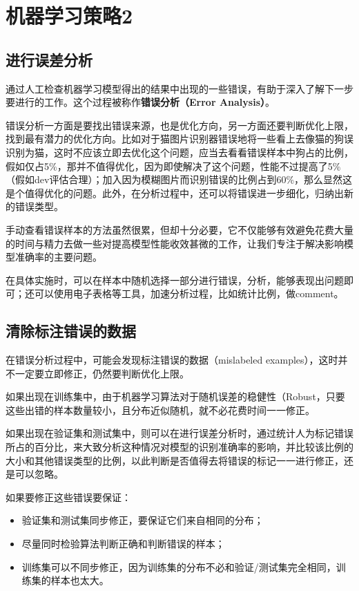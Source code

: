\documentclass[../../main.tex]{subfiles}
\begin{document}
\chapter{机器学习策略2}

\section{进行误差分析}
通过人工检查机器学习模型得出的结果中出现的一些错误，有助于深入了解下一步要进行的工作。这个过程被称作\textbf{错误分析（Error Analysis）}。

错误分析一方面是要找出错误来源，也是优化方向，另一方面还要判断优化上限，找到最有潜力的优化方向。比如对于猫图片识别器错误地将一些看上去像猫的狗误识别为猫，这时不应该立即去优化这个问题，应当去看看错误样本中狗占的比例，假如仅占5\%，那并不值得优化，因为即使解决了这个问题，性能不过提高了5\%（假如dev评估合理）；加入因为模糊图片而识别错误的比例占到60\%，那么显然这是个值得优化的问题。此外，在分析过程中，还可以将错误进一步细化，归纳出新的错误类型。

手动查看错误样本的方法虽然很累，但却十分必要，它不仅能够有效避免花费大量的时间与精力去做一些对提高模型性能收效甚微的工作，让我们专注于解决影响模型准确率的主要问题。

在具体实施时，可以在样本中随机选择一部分进行错误，分析，能够表现出问题即可；还可以使用电子表格等工具，加速分析过程，比如统计比例，做comment。

\section{清除标注错误的数据}
在错误分析过程中，可能会发现标注错误的数据（mislabeled examples），这时并不一定要立即修正，仍然要判断优化上限。

如果出现在训练集中，由于机器学习算法对于随机误差的稳健性（Robust，只要这些出错的样本数量较小，且分布近似随机，就不必花费时间一一修正。

如果出现在验证集和测试集中，则可以在进行误差分析时，通过统计人为标记错误所占的百分比，来大致分析这种情况对模型的识别准确率的影响，并比较该比例的大小和其他错误类型的比例，以此判断是否值得去将错误的标记一一进行修正，还是可以忽略。

如果要修正这些错误要保证：
\begin{itemize}
    \item 验证集和测试集同步修正，要保证它们来自相同的分布；
    \item 尽量同时检验算法判断正确和判断错误的样本；
    \item 训练集可以不同步修正，因为训练集的分布不必和验证/测试集完全相同，训练集的样本也太大。
\end{itemize}
\end{document}
